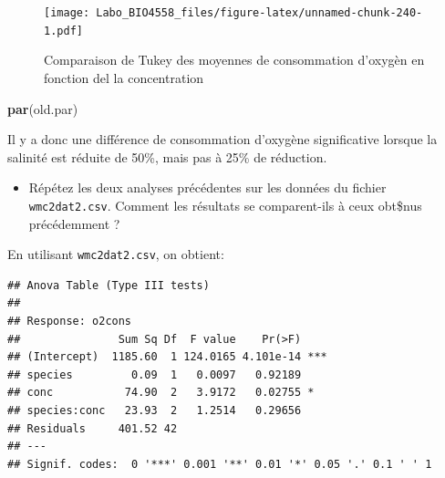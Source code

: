 \documentclass[12pt,]{book}
\newenvironment{Shaded}{\begin{snugshade}}{\end{snugshade}}
\newcommand{\DataTypeTok}[1]{\textcolor[rgb]{0.27,0.27,0.27}{#1}}
\newcommand{\KeywordTok}[1]{\textcolor[rgb]{0.27,0.27,0.27}{\textbf{#1}}}
\newcommand{\NormalTok}[1]{#1}
\newcommand{\OperatorTok}[1]{\textcolor[rgb]{0.43,0.43,0.43}{\textbf{#1}}}
\newcommand{\StringTok}[1]{\textcolor[rgb]{0.5,0.5,0.5}{#1}}
\providecommand{\tightlist}{%
  \setlength{\itemsep}{0pt}\setlength{\parskip}{0pt}}
\begin{document}
\begin{figure}
\centering
\texttt{[image: Labo\_BIO4558\_files/figure-latex/unnamed-chunk-240-1.pdf]}
\caption{\label{fig:unnamed-chunk-240}Comparaison de Tukey des moyennes de consommation d'oxygèn en fonction del la concentration}
\end{figure}

\begin{Shaded}
\begin{Highlighting}[]
\KeywordTok{par}\NormalTok{(old.par)}
\end{Highlighting}
\end{Shaded}

Il y a donc une différence de consommation d'oxygène significative lorsque la salinité est réduite de 50\%, mais pas à 25\% de réduction.

\begin{itemize}
\tightlist
\item
  Répétez les deux analyses précédentes sur les données du fichier \texttt{wmc2dat2.csv}. Comment les résultats se comparent-ils à ceux obt\$nus précédemment ?
\end{itemize}

\begin{Shaded}
\end{Shaded}

En utilisant \texttt{wmc2dat2.csv}, on obtient:

\begin{verbatim}
## Anova Table (Type III tests)
## 
## Response: o2cons
##               Sum Sq Df  F value    Pr(>F)    
## (Intercept)  1185.60  1 124.0165 4.101e-14 ***
## species         0.09  1   0.0097   0.92189    
## conc           74.90  2   3.9172   0.02755 *  
## species:conc   23.93  2   1.2514   0.29656    
## Residuals     401.52 42                       
## ---
## Signif. codes:  0 '***' 0.001 '**' 0.01 '*' 0.05 '.' 0.1 ' ' 1
\end{verbatim}
\end{document}
